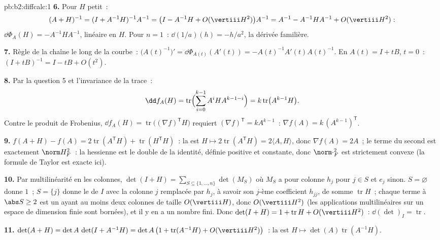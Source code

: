 \begin{solution}{pb:b2:diffcalc:1}
\textbf{6.} Pour $H$ petit~:
\[
(A+H)^{-1} = (I + A^{-1}H)^{-1}A^{-1}
= \bigl(I - A^{-1}H + O(\vertiii H^2)\bigr)A^{-1}
= A^{-1} - A^{-1}HA^{-1} + O(\vertiii H^2) :
\]
$\dd\Phi_A(H) = -A^{-1}HA^{-1}$, linéaire en $H$. Pour $n = 1$~:
$\dd(1/a)(h) = -h/a^2$, la dérivée familière.

\textbf{7.} Règle de la chaîne le long de la courbe~:
$\bigl(A(t)^{-1}\bigr)' = \dd\Phi_{A(t)}(A'(t)) =
-A(t)^{-1}A'(t)A(t)^{-1}$. En $A(t) = I + tB$, $t = 0$~: $(I +
tB)^{-1} = I - tB + O(t^2)$.

\textbf{8.} Par la question 5 et l'invariance  de la trace~:
\[
\dd f_A(H) = \operatorname{tr}\Bigl(\sum_{i=0}^{k-1}
A^iHA^{k-1-i}\Bigr) = k\operatorname{tr}\bigl(A^{k-1}H\bigr) .
\]
Contre le produit de Frobenius, $\dd f_A(H) =
\operatorname{tr}\bigl((\nabla f)^{\mathsf T}H\bigr)$ requiert
$(\nabla f)^{\mathsf T} = kA^{k-1}$~: $\nabla f(A) =
k\,(A^{k-1})^{\mathsf T}$.

\textbf{9.} $f(A + H) - f(A) = 2\operatorname{tr}
(A^{\mathsf T}H) + \operatorname{tr}(H^{\mathsf T}H)$~: la
 est $H \mapsto 2\operatorname{tr}(A^{\mathsf T}H) =
2\langle A, H\rangle$, donc $\nabla f(A) = 2A$~; le terme du second
 est exactement $\norm H_F^2$~: la hessienne est le double de
la  identité, définie positive et constante, donc
$\norm\cdot_F^2$ est strictement convexe (la formule de Taylor est
exacte ici).

\textbf{10.} Par multilinéarité en les colonnes, $\det(I + H) =
\sum_{S\subseteq\{1,\dots,n\}}\det(M_S)$ où $M_S$ a pour colonne
$h_j$ pour $j \in S$ et $e_j$ sinon. $S = \varnothing$
donne $1$~; $S = \{j\}$ donne le  de $I$ avec la colonne
$j$ remplacée par $h_j$, à savoir son $j$-ème coefficient $h_{jj}$,
de somme $\operatorname{tr}H$~; chaque terme à $\abs S \geq 2$
est un  ayant au moins deux colonnes de taille
$O(\vertiii H)$, donc $O(\vertiii H^2)$ (les applications
multilinéaires sur un espace de dimension finie sont bornées), et
il y en a un nombre fini. Donc $\det(I + H) = 1 + \operatorname{tr}H +
O(\vertiii H^2)$~: $\dd(\det)_I = \operatorname{tr}$.

\textbf{11.} $\det(A + H) = \det A\,\det(I + A^{-1}H) =
\det A\,\bigl(1 + \operatorname{tr}(A^{-1}H) +
O(\vertiii H^2)\bigr)$~: la  est $H \mapsto
\det(A)\operatorname{tr}(A^{-1}H)$.


\end{solution}
